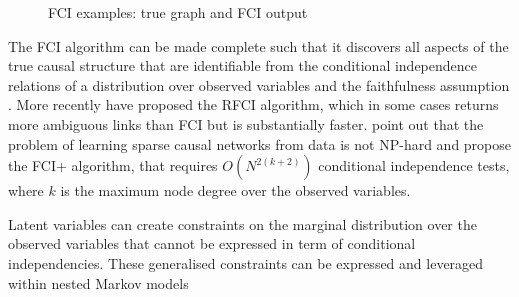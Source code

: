 \begin{figure}
\begin{subfigure}[t]{0.4\textwidth}
\end{subfigure}
\caption{FCI examples: true graph and FCI output}
\label{fig:FCIExamples}
\end{figure} 

The FCI algorithm can be made complete such that it discovers all aspects of the true causal structure that are identifiable from the conditional independence relations of a distribution over observed variables and the faithfulness assumption \citep{Zhang2008}. More recently \citet{Colombo2012} have proposed the RFCI algorithm, which in some cases returns more ambiguous links than FCI but is substantially faster. \citet{Claassen2013} point out that the problem of learning sparse causal networks from data is not NP-hard and propose the FCI+ algorithm, that requires $O(N^{2(k+2)})$ conditional independence tests, where $k$ is the maximum node degree over the observed variables. 

Latent variables can create constraints on the marginal distribution over the observed variables that cannot be expressed in term of conditional independencies. These generalised constraints can be expressed and leveraged within nested Markov models \citep{Richardson2012,Shipster2014} 



